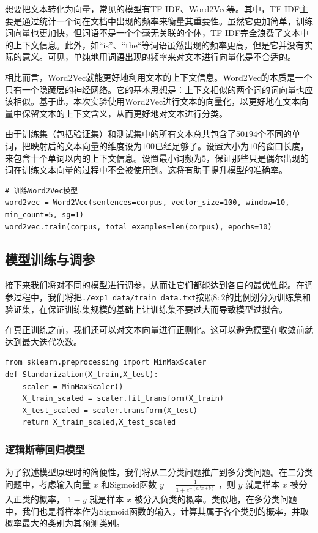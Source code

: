 \documentclass{article}
\begin{document}
想要把文本转化为向量，常见的模型有TF-IDF、Word2Vec等。其中，TF-IDF主要是通过统计一个词在文档中出现的频率来衡量其重要性。虽然它更加简单，训练词向量也更加快，但词语不是一个个毫无关联的个体，TF-IDF完全浪费了文本中的上下文信息。此外，如“is”、“the“等词语虽然出现的频率更高，但是它并没有实际的意义。可见，单纯地用词语出现的频率来对文本进行向量化是不合适的。

相比而言，Word2Vec就能更好地利用文本的上下文信息。Word2Vec的本质是一个只有一个隐藏层的神经网络。它的基本思想是：上下文相似的两个词的词向量也应该相似。基于此，本次实验使用Word2Vec进行文本的向量化，以更好地在文本向量中保留文本的上下文含义，从而更好地对文本进行分类。

由于训练集（包括验证集）和测试集中的所有文本总共包含了$50194$个不同的单词，把映射后的文本向量的维度设为$100$已经足够了。设置大小为$10$的窗口长度，来包含十个单词以内的上下文信息。设置最小词频为$5$，保证那些只是偶尔出现的词在训练文本向量的过程中不会被使用到。这将有助于提升模型的准确率。

\begin{lstlisting}
# 训练Word2Vec模型
word2vec = Word2Vec(sentences=corpus, vector_size=100, window=10, min_count=5, sg=1)
word2vec.train(corpus, total_examples=len(corpus), epochs=10)
\end{lstlisting}

\subsection{模型训练与调参}
接下来我们将对不同的模型进行调参，从而让它们都能达到各自的最优性能。在调参过程中，我们将把\lstinline|./exp1_data/train_data.txt|按照$8:2$的比例划分为训练集和验证集，在保证训练集规模的基础上让训练集不要过大而导致模型过拟合。

在真正训练之前，我们还可以对文本向量进行正则化。这可以避免模型在收敛前就达到最大迭代次数。
\begin{lstlisting}
from sklearn.preprocessing import MinMaxScaler
def Standarization(X_train,X_test):
    scaler = MinMaxScaler()
    X_train_scaled = scaler.fit_transform(X_train)
    X_test_scaled = scaler.transform(X_test)
    return X_train_scaled,X_test_scaled
\end{lstlisting}

\subsubsection{逻辑斯蒂回归模型}

为了叙述模型原理时的简便性，我们将从二分类问题推广到多分类问题。在二分类问题中，考虑输入向量 $x$ 和Sigmoid函数 $y=\frac{1}{1+e^{-(w^{T}x+b)}}$ ，则 $y$ 就是样本 $x$ 被分入正类的概率， $1-y$ 就是样本 $x$ 被分入负类的概率。类似地，在多分类问题中，我们也是将样本作为Sigmoid函数的输入，计算其属于各个类别的概率，并取概率最大的类别为其预测类别。
\end{document}
